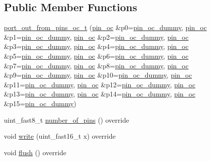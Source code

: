 \subsection*{Public Member Functions}
\begin{DoxyCompactItemize}
\item 
\hyperlink{classhwlib_1_1port__out__from__pins__oc__t_a477b6226fdc467dd1c64e285a9ede4f9}{port\+\_\+out\+\_\+from\+\_\+pins\+\_\+oc\+\_\+t} (\hyperlink{classhwlib_1_1pin__oc}{pin\+\_\+oc} \&p0=\hyperlink{namespacehwlib_a56c2e1c8df25a3fe5db02c83940acbfc}{pin\+\_\+oc\+\_\+dummy}, \hyperlink{classhwlib_1_1pin__oc}{pin\+\_\+oc} \&p1=\hyperlink{namespacehwlib_a56c2e1c8df25a3fe5db02c83940acbfc}{pin\+\_\+oc\+\_\+dummy}, \hyperlink{classhwlib_1_1pin__oc}{pin\+\_\+oc} \&p2=\hyperlink{namespacehwlib_a56c2e1c8df25a3fe5db02c83940acbfc}{pin\+\_\+oc\+\_\+dummy}, \hyperlink{classhwlib_1_1pin__oc}{pin\+\_\+oc} \&p3=\hyperlink{namespacehwlib_a56c2e1c8df25a3fe5db02c83940acbfc}{pin\+\_\+oc\+\_\+dummy}, \hyperlink{classhwlib_1_1pin__oc}{pin\+\_\+oc} \&p4=\hyperlink{namespacehwlib_a56c2e1c8df25a3fe5db02c83940acbfc}{pin\+\_\+oc\+\_\+dummy}, \hyperlink{classhwlib_1_1pin__oc}{pin\+\_\+oc} \&p5=\hyperlink{namespacehwlib_a56c2e1c8df25a3fe5db02c83940acbfc}{pin\+\_\+oc\+\_\+dummy}, \hyperlink{classhwlib_1_1pin__oc}{pin\+\_\+oc} \&p6=\hyperlink{namespacehwlib_a56c2e1c8df25a3fe5db02c83940acbfc}{pin\+\_\+oc\+\_\+dummy}, \hyperlink{classhwlib_1_1pin__oc}{pin\+\_\+oc} \&p7=\hyperlink{namespacehwlib_a56c2e1c8df25a3fe5db02c83940acbfc}{pin\+\_\+oc\+\_\+dummy}, \hyperlink{classhwlib_1_1pin__oc}{pin\+\_\+oc} \&p8=\hyperlink{namespacehwlib_a56c2e1c8df25a3fe5db02c83940acbfc}{pin\+\_\+oc\+\_\+dummy}, \hyperlink{classhwlib_1_1pin__oc}{pin\+\_\+oc} \&p9=\hyperlink{namespacehwlib_a56c2e1c8df25a3fe5db02c83940acbfc}{pin\+\_\+oc\+\_\+dummy}, \hyperlink{classhwlib_1_1pin__oc}{pin\+\_\+oc} \&p10=\hyperlink{namespacehwlib_a56c2e1c8df25a3fe5db02c83940acbfc}{pin\+\_\+oc\+\_\+dummy}, \hyperlink{classhwlib_1_1pin__oc}{pin\+\_\+oc} \&p11=\hyperlink{namespacehwlib_a56c2e1c8df25a3fe5db02c83940acbfc}{pin\+\_\+oc\+\_\+dummy}, \hyperlink{classhwlib_1_1pin__oc}{pin\+\_\+oc} \&p12=\hyperlink{namespacehwlib_a56c2e1c8df25a3fe5db02c83940acbfc}{pin\+\_\+oc\+\_\+dummy}, \hyperlink{classhwlib_1_1pin__oc}{pin\+\_\+oc} \&p13=\hyperlink{namespacehwlib_a56c2e1c8df25a3fe5db02c83940acbfc}{pin\+\_\+oc\+\_\+dummy}, \hyperlink{classhwlib_1_1pin__oc}{pin\+\_\+oc} \&p14=\hyperlink{namespacehwlib_a56c2e1c8df25a3fe5db02c83940acbfc}{pin\+\_\+oc\+\_\+dummy}, \hyperlink{classhwlib_1_1pin__oc}{pin\+\_\+oc} \&p15=\hyperlink{namespacehwlib_a56c2e1c8df25a3fe5db02c83940acbfc}{pin\+\_\+oc\+\_\+dummy})
\item 
uint\+\_\+fast8\+\_\+t \hyperlink{classhwlib_1_1port__out__from__pins__oc__t_adcf78d299959f17d7515f7290206df12}{number\+\_\+of\+\_\+pins} () override
\item 
void \hyperlink{classhwlib_1_1port__out__from__pins__oc__t_ab146f9cb459f7a3b09bd2beae0948210}{write} (uint\+\_\+fast16\+\_\+t x) override
\item 
void \hyperlink{classhwlib_1_1port__out__from__pins__oc__t_acdd899bd1428f01cca081a76a5bc7475}{flush} () override
\end{DoxyCompactItemize}


